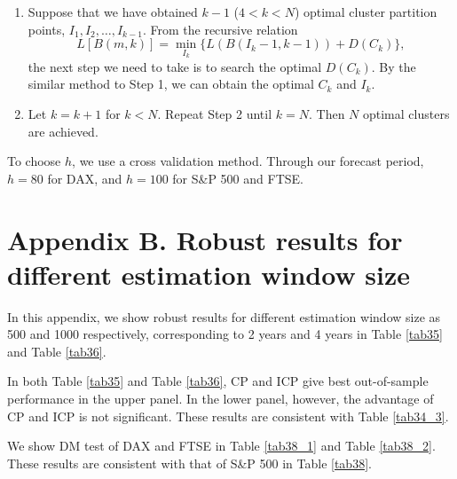 \documentclass[preprint,12pt,authoryear]{elsarticle}
\begin{document}
\begin{appendix}
\begin{enumerate}[Step 1.]
\item Suppose that we have obtained $k-1$ ($4<k<N$) optimal cluster partition points, $I_1,I_2,\dots,I_{k-1}$. From the recursive relation
$$L[B(m,k)]=\min_{I_k} \{L( B ( I_k-1,k-1 ))+D(C_k)\},$$ the next step we need to take is to search the optimal $D(C_k)$.
By the similar method to Step 1, we can obtain the optimal $C_k$ and $I_k$.
\item Let $k = k+1$ for $k<N$. Repeat Step 2 until $k=N$. Then $N$ optimal clusters are achieved.
\end{enumerate}
To choose $h$, we use a cross validation method. Through our forecast period, $h=80$ for DAX, and $h=100$ for S\&P 500 and FTSE.

\section*{Appendix B. Robust results for different estimation window size}

In this appendix, we show robust results for different estimation window size as 500 and 1000 respectively, corresponding to 2 years and 4 years in Table \ref{tab35} and Table \ref{tab36}.

In both Table \ref{tab35} and Table \ref{tab36}, CP and ICP give best out-of-sample performance in the upper panel. In the lower panel, however, the advantage of CP and ICP is not significant. These results are consistent with Table \ref{tab34_3}.

We show DM test of DAX and FTSE in Table \ref{tab38_1} and Table \ref{tab38_2}. These results are consistent with that of S\&P 500 in Table \ref{tab38}.
\end{appendix}

\newpage

% 
\end{document}

